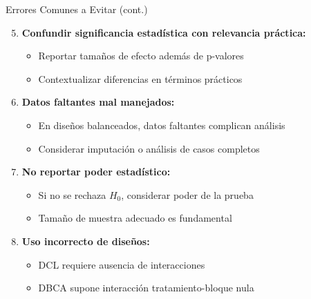 \documentclass[aspectratio=169]{beamer}
\begin{document}
\begin{frame}{Errores Comunes a Evitar (cont.)}
\begin{enumerate}
\setcounter{enumi}{4}
\item \textbf{Confundir significancia estadística con relevancia práctica:}
\begin{itemize}
\item Reportar tamaños de efecto además de p-valores
\item Contextualizar diferencias en términos prácticos
\end{itemize}

\vspace{0.2cm}

\item \textbf{Datos faltantes mal manejados:}
\begin{itemize}
\item En diseños balanceados, datos faltantes complican análisis
\item Considerar imputación o análisis de casos completos
\end{itemize}

\vspace{0.2cm}

\item \textbf{No reportar poder estadístico:}
\begin{itemize}
\item Si no se rechaza $H_0$, considerar poder de la prueba
\item Tamaño de muestra adecuado es fundamental
\end{itemize}

\vspace{0.2cm}

\item \textbf{Uso incorrecto de diseños:}
\begin{itemize}
\item DCL requiere ausencia de interacciones
\item DBCA supone interacción tratamiento-bloque nula
\end{itemize}
\end{enumerate}
\end{frame}
\end{document}
